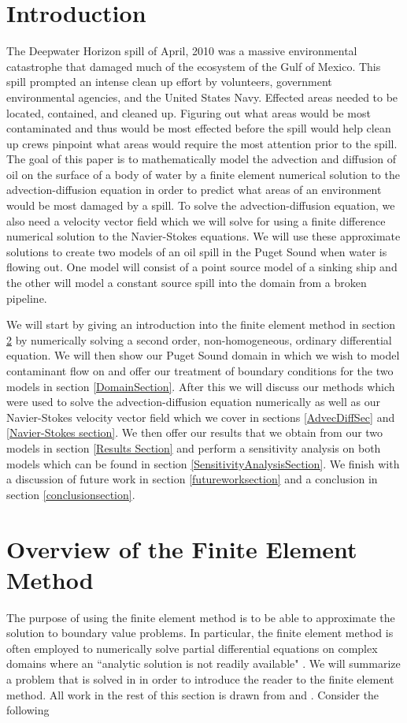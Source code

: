\documentclass[a4paper]{article}
\theoremstyle{remark}
\theoremstyle{remark}
\begin{document}
\section{Introduction} \label{intro}
The Deepwater Horizon spill of April, 2010 was a massive environmental catastrophe that damaged much of the ecosystem of the Gulf of Mexico. This spill prompted an intense clean up effort by volunteers, government environmental agencies, and the United States Navy. Effected areas needed to be located, contained, and cleaned up. Figuring out what areas would be most contaminated and thus would be most effected before the spill would help clean up crews pinpoint what areas would require the most attention prior to the spill. The goal of this paper is to mathematically model the advection and diffusion of oil on the surface of a body of water by a finite element numerical solution to the advection-diffusion equation in order to predict what areas of an environment would be most damaged by a spill. To solve the advection-diffusion equation, we also need a velocity vector field which we will solve for using a finite difference numerical solution to the Navier-Stokes equations. We will use these approximate solutions to create two models of an oil spill in the Puget Sound when water is flowing out. One model will consist of a point source model of a sinking ship and the other will model a constant source spill into the domain from a broken pipeline.
\par
We will start by giving an introduction into the finite element method in section \ref{OverviewFEM} by numerically solving a second order, non-homogeneous, ordinary differential equation. We will then show our Puget Sound domain in which we wish to model contaminant flow on and offer our treatment of boundary conditions for the two models in section \ref{DomainSection}. After this we will discuss our methods which were used to solve the advection-diffusion equation numerically as well as our Navier-Stokes velocity vector field which we cover in sections \ref{AdvecDiffSec} and \ref{Navier-Stokes section}. We then offer our results that we obtain from our two models in section \ref{Results Section} and perform a sensitivity analysis on both models which can be found in section \ref{SensitivityAnalysisSection}. We finish with a discussion of future work in section \ref{futureworksection} and a conclusion in section \ref{conclusionsection}.

\section{Overview of the Finite Element Method} \label{OverviewFEM}
The purpose of using the finite element method is to be able to approximate the solution to boundary value problems. In particular, the finite element method is often employed to numerically solve partial differential equations on complex domains where an ``analytic solution is not readily available" \cite{Sullivan}. We will summarize a problem that is solved in \cite{Johnson} in order to introduce the reader to the finite element method. All work in the rest of this section is drawn from \cite{Johnson} and \cite{50LinesofMATLAB}. Consider the following
\end{document}

